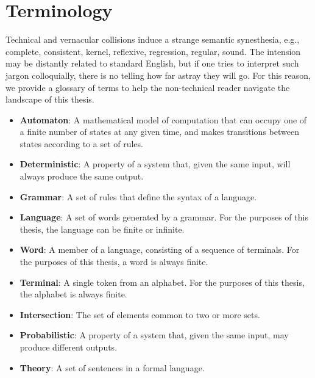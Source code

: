 \chapter*{\rm\bfseries Terminology}
\label{ch:terminology}

Technical and vernacular collisions induce a strange semantic synesthesia, e.g., complete, consistent, kernel, reflexive, regression, regular, sound. The intension may be distantly related to standard English, but if one tries to interpret such jargon colloquially, there is no telling how far astray they will go. For this reason, we provide a glossary of terms to help the non-technical reader navigate the landscape of this thesis.

\begin{itemize}
    \item \textbf{Automaton}: A mathematical model of computation that can occupy one of a finite number of states at any given time, and makes transitions between states according to a set of rules.
    \item \textbf{Deterministic}: A property of a system that, given the same input, will always produce the same output.
    \item \textbf{Grammar}: A set of rules that define the syntax of a language.
    \item \textbf{Language}: A set of words generated by a grammar. For the purposes of this thesis, the language can be finite or infinite.
    \item \textbf{Word}: A member of a language, consisting of a sequence of terminals. For the purposes of this thesis, a word is always finite.
    \item \textbf{Terminal}: A single token from an alphabet. For the purposes of this thesis, the alphabet is always finite.
    \item \textbf{Intersection}: The set of elements common to two or more sets.
    \item \textbf{Probabilistic}: A property of a system that, given the same input, may produce different outputs.
    \item \textbf{Theory}: A set of sentences in a formal language.
\end{itemize}